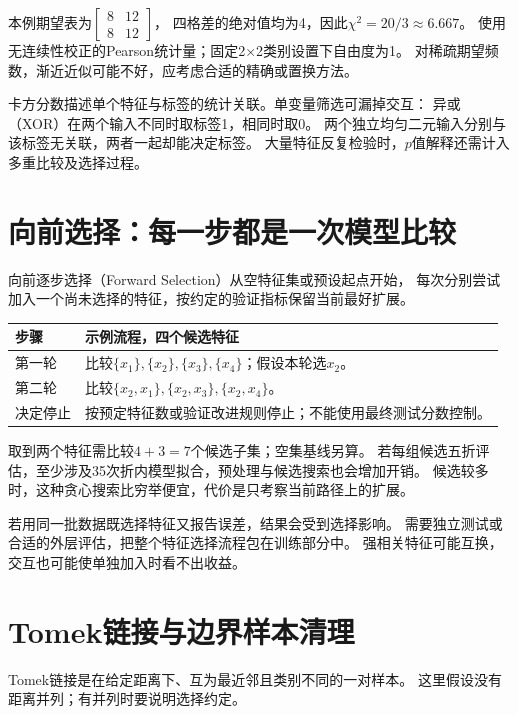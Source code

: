 本例期望表为$\left[\begin{smallmatrix}8&12\\8&12\end{smallmatrix}\right]$，
四格差的绝对值均为4，因此$\chi^2=20/3\approx6.667$。
使用无连续性校正的Pearson统计量；固定2×2类别设置下自由度为1。
对稀疏期望频数，渐近近似可能不好，应考虑合适的精确或置换方法。

卡方分数描述单个特征与标签的统计关联。单变量筛选可漏掉交互：
异或（XOR）在两个输入不同时取标签1，相同时取0。
两个独立均匀二元输入分别与该标签无关联，两者一起却能决定标签。
大量特征反复检验时，$p$值解释还需计入多重比较及选择过程。


\section{向前选择：每一步都是一次模型比较}
\label{sec:reliability-forward}
向前逐步选择（Forward Selection）从空特征集或预设起点开始，
每次分别尝试加入一个尚未选择的特征，按约定的验证指标保留当前最好扩展。

\begin{center}
\begin{tabularx}{\textwidth}{P{29mm}Y}
\toprule
步骤 & 示例流程，四个候选特征\\
\midrule
第一轮 & 比较$\{x_1\},\{x_2\},\{x_3\},\{x_4\}$；假设本轮选$x_2$。\\
第二轮 & 比较$\{x_2,x_1\},\{x_2,x_3\},\{x_2,x_4\}$。\\
决定停止 & 按预定特征数或验证改进规则停止；不能使用最终测试分数控制。\\
\bottomrule
\end{tabularx}
\end{center}

取到两个特征需比较$4+3=7$个候选子集；空集基线另算。
若每组候选五折评估，至少涉及35次折内模型拟合，预处理与候选搜索也会增加开销。
候选较多时，这种贪心搜索比穷举便宜，代价是只考察当前路径上的扩展。

若用同一批数据既选择特征又报告误差，结果会受到选择影响。
需要独立测试或合适的外层评估，把整个特征选择流程包在训练部分中。
强相关特征可能互换，交互也可能使单独加入时看不出收益。


\section{Tomek链接与边界样本清理}
\label{sec:reliability-tomek}
Tomek链接是在给定距离下、互为最近邻且类别不同的一对样本。
这里假设没有距离并列；有并列时要说明选择约定。

